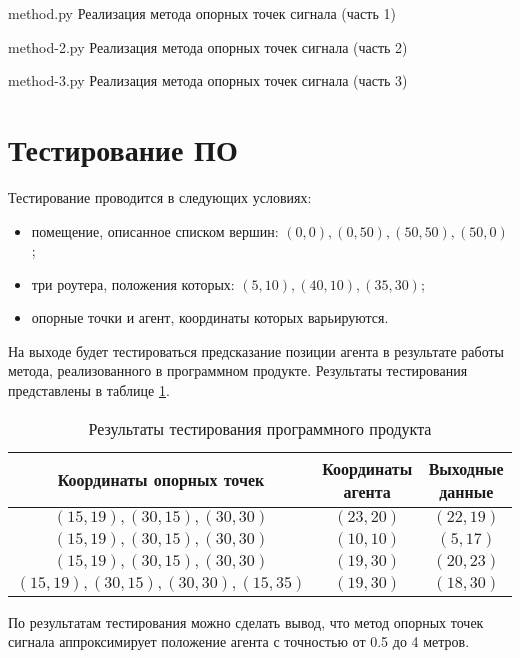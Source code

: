     {method.py}
    {Реализация метода опорных точек сигнала (часть 1)}

    {method-2.py}
    {Реализация метода опорных точек сигнала (часть 2)}

\clearpage

    {method-3.py}
    {Реализация метода опорных точек сигнала (часть 3)}

\clearpage

\section{Тестирование ПО}

Тестирование проводится в следующих условиях:

\begin{itemize}[label=---]
    \item помещение, описанное списком вершин: $(0, 0), (0, 50), (50, 50), (50, 0)$;
    \item три роутера, положения которых: $(5, 10), (40, 10), (35, 30)$;
    \item опорные точки и агент, координаты которых варьируются.
\end{itemize}

На выходе будет тестироваться предсказание позиции агента в результате работы метода, реализованного в программном продукте. Результаты тестирования представлены в таблице \ref{tab:test}.

\begin{table}[H]
    \caption{Результаты тестирования программного продукта}
    \label{tab:test}
    \centering
    \begin{tabular}{|c|c|c|}
        \hline
        Координаты опорных точек & Координаты агента & Выходные данные \\
        \hline
        $(15, 19), (30, 15), (30, 30)$ & $(23, 20)$ & $(22, 19)$ \\
        \hline
        $(15, 19), (30, 15), (30, 30)$ & $(10, 10)$ & $(5, 17)$ \\
        \hline
        $(15, 19), (30, 15), (30, 30)$ & $(19, 30)$ & $(20, 23)$ \\
        \hline
        $(15, 19), (30, 15), (30, 30), (15, 35)$ & $(19, 30)$ & $(18, 30)$ \\
        \hline
    \end{tabular}
\end{table}

По результатам тестирования можно сделать вывод, что метод опорных точек сигнала аппроксимирует положение агента с точностью от 0.5 до 4 метров.
